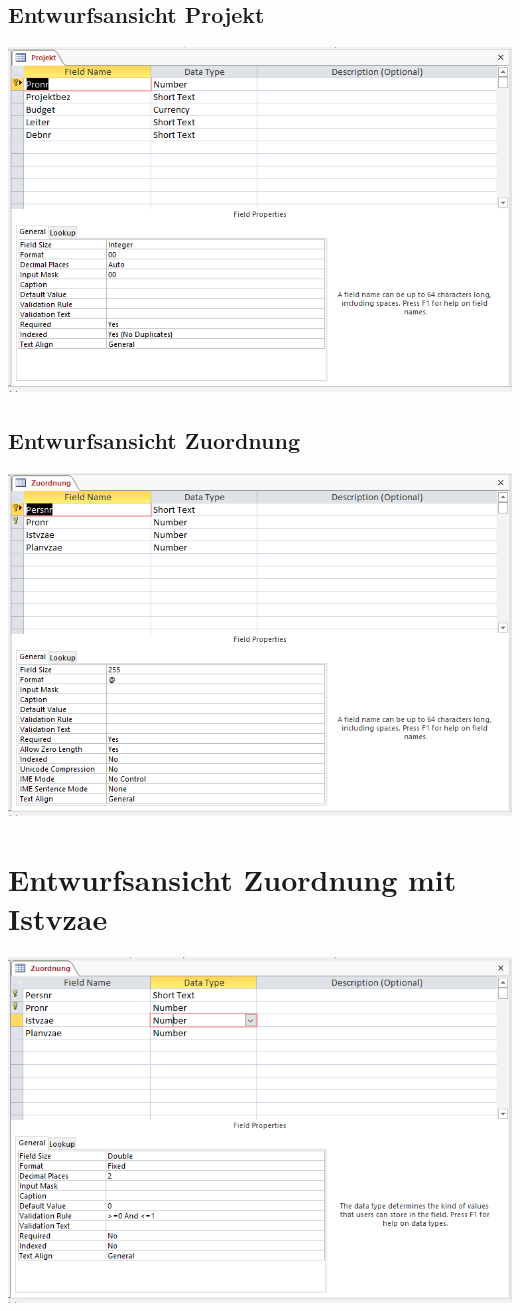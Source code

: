 \subsection{Entwurfsansicht Projekt}
\includegraphics[width=.98\columnwidth]{1Projekt.PNG}
\subsection{Entwurfsansicht Zuordnung}
\includegraphics[width=.98\columnwidth]{1Zuordnung.PNG}

\section{Entwurfsansicht Zuordnung mit Istvzae}
\includegraphics[width=.98\columnwidth]{2.PNG}

